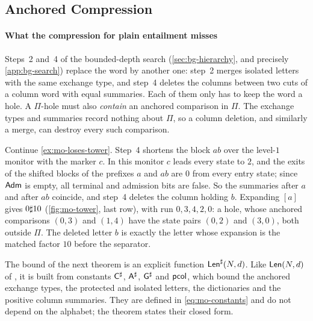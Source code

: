 

\subsection{Anchored Compression}\label{sec:mo-compression}

\paragraph{What the compression for plain entailment misses}
Steps~2 and~4 of the bounded-depth search (\cref{sec:bg-hierarchy}, and
precisely \cref{app:bg-search}) replace the word by another one: step~2 merges
isolated letters with the same exchange type, and step~4 deletes the columns
between two cuts of a column word with equal summaries. Each of them only has
to keep the word a hole. A $\Pi$-hole must also \emph{contain} an anchored
comparison in $\Pi$. The exchange types and summaries record nothing about
$\Pi$, so a column deletion, and similarly a merge, can destroy every such
comparison.

\begin{example}\label{ex:mo-loses}
Continue \cref{ex:mo-loses-tower}. Step~4 shortens the block $ab$ over the
level-$1$ monitor with the marker $c$. In this monitor $c$ leads every state to
$2$, and the exits of the shifted blocks of the prefixes $a$ and $ab$ are $0$
from every entry state; since $\mathsf{Adm}$ is empty, all terminal and admission bits
are false. So the summaries after $a$ and after $ab$ coincide, and step~4
deletes the column holding $b$. Expanding $[a]$ gives $0\sharp10$
(\cref{fig:mo-tower}, last row), with run
$0,3,4,2,0$: a hole, whose anchored comparisons $(0,3)$ and $(1,4)$ have the
state pairs $(0,2)$ and $(3,0)$, both outside $\Pi$. The deleted letter $b$ is
exactly the letter whose expansion is the matched factor $10$ before the
separator.
\end{example}

The bound of the next theorem is an explicit function $\mathsf{Len}^{\sharp}(N,d)$. Like
$\mathsf{Len}(N,d)$ of \citet{Zhao26}, it is built from constants $\mathsf{C}^{\sharp}$,
$\mathsf{A}^{\sharp}$, $\mathsf{G}^{\sharp}$ and $\mathsf{pcol}$, which bound the anchored exchange types,
the protected and isolated letters, the dictionaries and the positive column
summaries. They are defined in \cref{eq:mo-constants} and do not depend on the
alphabet; the theorem states their closed form.

